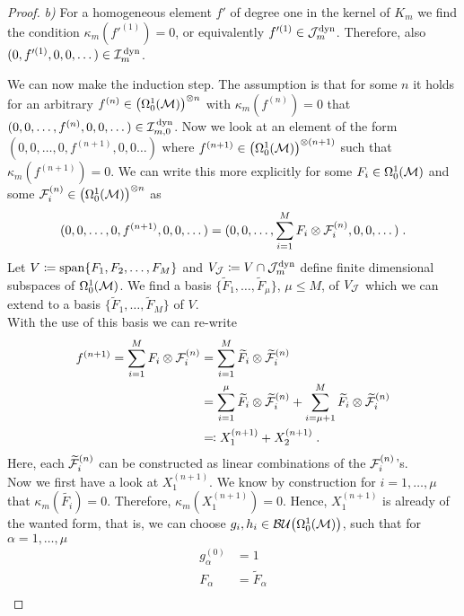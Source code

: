 \begin{proof}
\emph{b)} For a homogeneous element $f'$ of degree one in the kernel of $K_m$ we find the condition $\kappa_m(f'^{(1)}) = 0$, or equivalently $f'^{(1)}  \in \mathcal{J}_m^\text{dyn}$. Therefore, also $(0, f'^{(1)} , 0 ,0 ,\dots) \in \mathcal{I}_m^\text{\,dyn}$. \par
We can now make the induction step.
The assumption is that for some $n$ it holds for an arbitrary $f^{(n)} \in \left(\Omega^1_0(\mathcal{M})\right)^{\otimes n}$ with $\kappa_m(f^{(n)}) = 0$ that
$(0,0,\dots,f^{(n)},0,0,\dots) \in \mathcal{I}_{m,0}^\text{\,dyn}$.
Now we look at an element of the form $(0,0,\dots,0,f^{(n+1)},0,0\dots)$ where $f^{(n+1)} \in \left(\Omega^1_0(\mathcal{M})\right)^{\otimes (n+1)}$ such that $\kappa_m(f^{(n+1)}) = 0$.
We can write this more explicitly for some $F_i \in \Omega^1_0(\mathcal{M})$ and some $\mathcal{F}_i^{(n)}\in \left(\Omega^1_0(\mathcal{M})\right)^{\otimes n}$ as
\begin{align}
(0,0,\dots,0,f^{(n+1)},0,0, \dots)  = (0,0,\dots,\sum\limits_{i=1}^{M} F_i \otimes \mathcal{F}_i^{(n)},0, 0 , \dots) \;.
\end{align}
%
Let $V \coloneqq \textrm{span}{\left\{F_1,F_2, \dots , F_M\right\} }$ and $V_{\mathcal{J}} \coloneqq V \cap \mathcal{J}_m^\text{dyn}$ define finite dimensional subspaces of $\Omega^1_0(\mathcal{M})$. We find a basis $\{ \widetilde{F}_1, \dots ,\widetilde{F}_\mu \}$, $\mu \leq M$, of $V_{\mathcal{J}}$ which we can extend to a basis $\{ \widetilde{F}_1, \dots ,\widetilde{F}_M \}$ of $V$.\\
With the use of this basis we can re-write
\begin{align}
f^{(n+1)} = \sum\limits_{i=1}^{M} F_i \otimes \mathcal{F}_i^{(n)}
&= \sum\limits_{i=1}^{M} \widetilde{F}_i \otimes \widetilde{\mathcal{F}}_i^{(n)} \notag\\
&= \sum\limits_{i=1}^{\mu} \widetilde{F}_i \otimes \widetilde{\mathcal{F}}_i^{(n)}  +  \sum\limits_{i=\mu + 1}^{M} \widetilde{F}_i \otimes \widetilde{\mathcal{F}}_i^{(n)} \notag\\
& \eqqcolon X_1^{(n+1)} + X_2^{(n+1)} \;.
\end{align}
Here, each $\widetilde{\mathcal{F}}_i^{(n)}$ can be constructed as linear combinations of the ${\mathcal{F}}_i^{(n)}$'s.\\
Now we first have a look at $X_1^{(n+1)}$. We know by construction for $i=1,\dots,\mu$ that  $\kappa_m ( \widetilde{F_i} ) = 0$. Therefore, $\kappa_m(X_1^{(n+1)}) = 0$. Hence, $X_1^{(n+1)}$ is already of the wanted form, that is, we can choose $g_{i}, h_{i} \in {\mathcal{BU}\big(\Omega^1_0(\ensuremath{\mathcal{M}})\big)}$, such that for $\alpha = 1, \dots , \mu$
\begin{align}
	g^{(0)}_{\alpha} &= 1 \\
	F_\alpha &= \widetilde{F}_\alpha \\

\end{align}
\end{proof}
